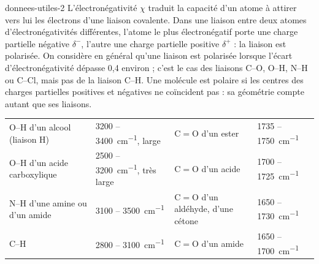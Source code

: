 \begin{blocEdition}{donnees-utiles-2}
\fontsize{10}{13.5}\selectfont
\label{figedition-donnees-2}
L'électronégativité $\chi$ traduit la capacité d'un atome à attirer vers lui les électrons d'une liaison covalente. Dans une
liaison entre deux atomes d'électronégativités différentes, l'atome le plus électronégatif porte une charge partielle
négative $\delta^-$, l'autre une charge partielle positive $\delta^+$ : la liaison est polarisée. On considère en général qu'une
liaison est polarisée lorsque l'écart d'électronégativité dépasse 0,4 environ ; c'est le cas des liaisons C--O, O--H, N--H ou
C--Cl, mais pas de la liaison C--H. Une molécule est polaire si les centres des charges partielles positives et négatives ne
coïncident pas : sa géométrie compte autant que ses liaisons.
{\small\begin{tabularx}{\linewidth}{@{}Yl|Yl@{}}\toprule
O--H d'un alcool (liaison H) & 3200 -- \qty{3400}{cm^{-1}}, large & C$=$O d'un ester & 1735 -- \qty{1750}{cm^{-1}} \\
O--H d'un acide carboxylique & 2500 -- \qty{3200}{cm^{-1}}, très large & C$=$O d'un acide & 1700 -- \qty{1725}{cm^{-1}} \\
N--H d'une amine ou d'un amide & 3100 -- \qty{3500}{cm^{-1}} & C$=$O d'un aldéhyde, d'une cétone & 1650 -- \qty{1730}{cm^{-1}} \\
C--H & 2800 -- \qty{3100}{cm^{-1}} & C$=$O d'un amide & 1650 -- \qty{1700}{cm^{-1}} \\\bottomrule
\end{tabularx}}
\end{blocEdition}

